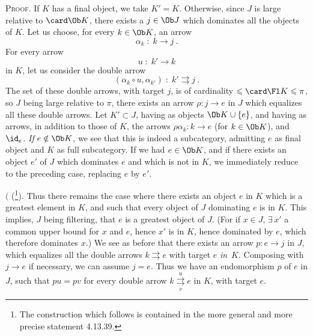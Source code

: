 \textsc{Proof}. If $K$ has a final object, we take $K' = K$. Otherwise, since $J$ is large relative to $\card \Ob K$, there exists a $j \in \Ob J$ which dominates all the objects of $K$. Let us choose, for every $k \in \Ob K$, an arrow
\[ \alpha_k \;:\; k \longrightarrow j \ . \]
For every arrow
\[ u \;:\; k' \longrightarrow k \]
in $K$, let us consider the double arrow
\[ (\alpha_k \circ u, \alpha_{k'}) \;:\; k' \rightrightarrows j \ . \]
The set of these double arrows, with target $j$, is of cardinality $\leqslant \card \Fl K \leqslant \pi$, so $J$ being large relative to $\pi$, there exists an arrow $\rho : j \longrightarrow e$ in $J$ which equalizes all these double arrows. Let $K' \subset J$, having as objects $\Ob K \cup \{e\}$, and having as arrows, in addition to
those of $K$, the arrows $\rho\alpha_k : k \longrightarrow e$ (for $k \in \Ob K$), and $\id_e$. \textit{If} $e \notin \Ob K$, we see that this is indeed a subcategory, admitting $e$ as final object and $K$ as full subcategory. If we had $e \in \Ob K$, and if there exists an object $e'$ of $J$ which dominates $e$ and which is not in $K$, we immediately reduce to the preceding case, replacing $e$ by $e'$.

$\Biggl($ (\footnote[161]{The construction which follows is contained in the more general and more precise statement 4.13.39.}). Thus there remains the case where there exists an object $e$ in $K$ which is a greatest element in $K$, and such that every object of $J$ dominating $e$ is in $K$. This implies, $J$ being filtering, that $e$ is a greatest object of $J$. (For if $x \in J$, $\exists\, x'$ a common upper bound for $x$ and $e$, hence $x'$ is in $K$, hence dominated by $e$, which therefore dominates $x$.) We see as before that there exists an arrow $p : e \longrightarrow j$ in $J$, which equalizes all the double arrows $k \rightrightarrows e$ with target $e$ \textit{in}~$K$. Composing with $j \longrightarrow e$ if necessary, we can assume $j = e$. Thus we have an endomorphism $p$ of $e$ in $J$, such that $pu = pv$ for every double arrow $k \overset{u}{\underset{v}{\rightrightarrows}} e$ in $K$, with target $e$.


